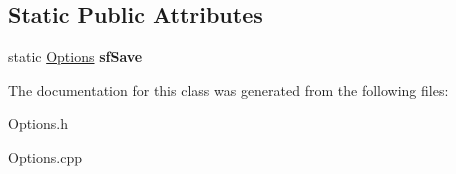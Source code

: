 \subsection*{\-Static \-Public \-Attributes}
\begin{DoxyCompactItemize}
\item 
\hypertarget{classOptions_a31107388eb391548487b39003112a8ec}{static \hyperlink{classOptions}{\-Options} {\bfseries sf\-Save}}\label{classOptions_a31107388eb391548487b39003112a8ec}

\end{DoxyCompactItemize}


\-The documentation for this class was generated from the following files\-:\begin{DoxyCompactItemize}
\item 
\-Options.\-h\item 
\-Options.\-cpp\end{DoxyCompactItemize}

